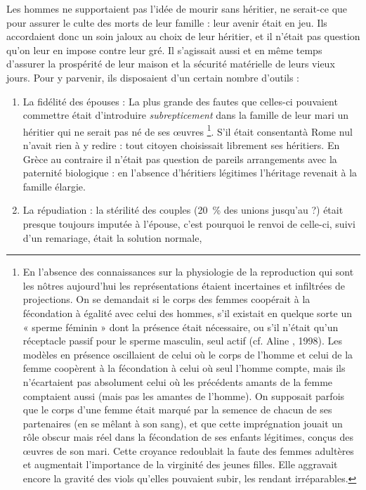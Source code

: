 Les hommes ne supportaient pas l'idée de mourir sans héritier, ne
serait-ce que pour assurer le culte des morts de leur famille : leur avenir
 était en jeu. Ils accordaient donc un soin jaloux au choix de
leur héritier, et il n'était pas question qu'on leur en impose contre leur
gré. Il s'agissait aussi et en même temps d'assurer la prospérité de leur
maison et la sécurité matérielle de leurs vieux jours. Pour y parvenir, ils disposaient
d'un certain nombre d'outils :

\begin{enumerate}
\item La fidélité des épouses : La plus grande des fautes que celles-ci
pouvaient commettre était d'introduire \emph{subrepticement} dans la famille de
leur mari un héritier qui ne serait pas né de ses œuvres%
\footnote{En l'absence des connaissances sur la physiologie de la reproduction qui sont les nôtres aujourd'hui les représentations étaient incertaines et infiltrées de projections. On se demandait si le corps des femmes coopérait à la 
fécondation à égalité avec celui des hommes, s'il existait en quelque sorte un « sperme féminin » dont la présence 
était nécessaire, ou s'il n'était qu'un réceptacle passif pour le sperme masculin, seul actif (cf. Aline , 
1998). Les modèles en présence oscillaient de celui où le corps de l'homme et celui de la femme coopèrent à la fécondation à celui où seul l'homme compte, mais ils n'écartaient pas absolument celui où les précédents amants de 
la femme comptaient aussi (mais pas les amantes de l'homme). On supposait parfois que le corps d'une femme 
était marqué par la semence de chacun de ses partenaires (en se mêlant à son sang), et que cette imprégnation jouait
un rôle obscur mais réel
dans la fécondation de ses
enfants légitimes,
conçus des œuvres
de son mari. Cette 
croyance redoublait la faute des femmes adultères et augmentait l'importance de la virginité des jeunes filles. Elle 
aggravait encore la gravité des viols qu'elles pouvaient subir, les rendant irréparables.}.
S'il était consentantà Rome nul n'avait rien à y redire : tout citoyen choisissait librement ses héritiers. En Grèce au contraire il n'était pas question de pareils arrangements avec la paternité biologique : en l'absence d'héritiers légitimes l'héritage revenait à la famille élargie. 
\item La répudiation : la stérilité des couples (20~\% des unions jusqu'au
 ?) était presque toujours imputée à l'épouse, c'est
pourquoi le renvoi de celle-ci, suivi d'un remariage, était la solution normale,

\end{enumerate}
